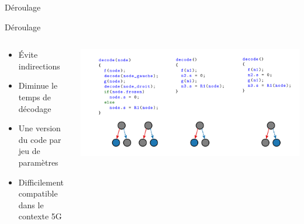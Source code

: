 \documentclass[t,compress,mathserif,12pt,xcolor=dvipsnames]{beamer}
\begin{document}
\begin{frame}[c]{Déroulage}
\end{frame}

\begin{frame}[c]{Déroulage}
\begin{columns}
	\begin{column}{.5\textwidth}
	\begin{itemize}
		\vfill
		\item \'Evite indirections
		\vfill
		\item Diminue le temps de décodage
		\vfill
		\item Une version du code par jeu de paramètres
		\vfill
		\item Difficilement compatible dans le contexte 5G
		\vfill
	\end{itemize}
	\end{column}

	\begin{column}{.5\textwidth}
		\vfill
			\includegraphics[width=\textwidth]{./fig/unrolling-4}
			\vfill
	\end{column}

\end{columns}
\end{frame}
\end{document}
